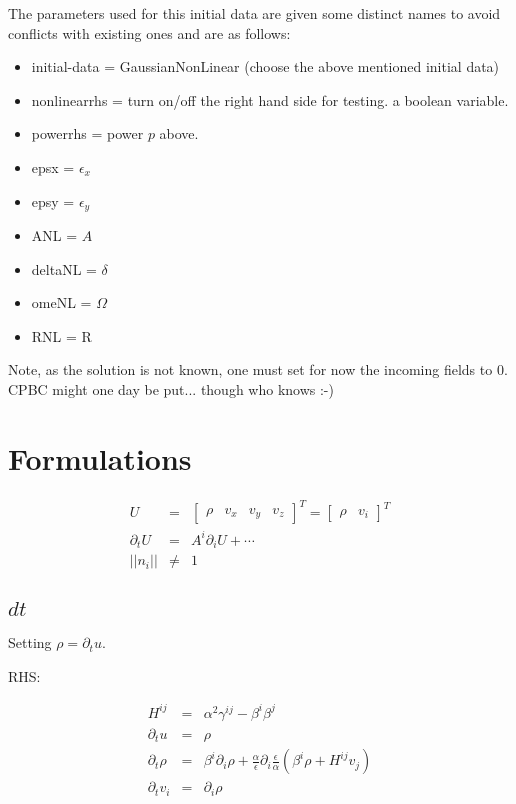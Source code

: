 \documentclass{article}
\begin{document}
The parameters used for this initial data are given some distinct names to
avoid conflicts with existing ones and are as follows:
\begin{itemize}
\item initial-data = GaussianNonLinear (choose the above mentioned initial data)
\item nonlinearrhs = turn on/off the right hand side for testing. a boolean variable.
\item powerrhs = power $p$ above.
\item epsx = $\epsilon_x$ 
\item epsy = $\epsilon_y$
\item ANL = $A$
\item deltaNL = $\delta$
\item omeNL =  $\Omega$
\item RNL = R
\end{itemize}

Note, as the solution is not known, one must set for now the incoming fields to $0$. CPBC might
one day be put... though who knows :-)



\section{Formulations}

\begin{eqnarray}
   U & = & \left[ \begin{array}{cccc} \rho & v_x & v_y & v_z
   \end{array} \right]^T = \left[ \begin{array}{cc} \rho & v_i
   \end{array} \right]^T
\\
   \partial_t U & = & A^i \partial_i U + \cdots
\\
   || n_i || & \ne & 1
\end{eqnarray}



\subsection{$dt$}

   Setting $\rho = \partial_t u$.

   RHS:

\begin{eqnarray}
   H^{ij} & = & \alpha^2 \gamma^{ij} - \beta^i \beta^j
\\
   \partial_t u & = & \rho
\\
   \partial_t \rho & = & \beta^i \partial_i \rho +
   \frac{\alpha}{\epsilon} \partial_i \frac{\epsilon}{\alpha} \left(
   \beta^i \rho + H^{ij} v_j \right)
\\
   \partial_t v_i & = & \partial_i \rho
\end{eqnarray}
\end{document}

